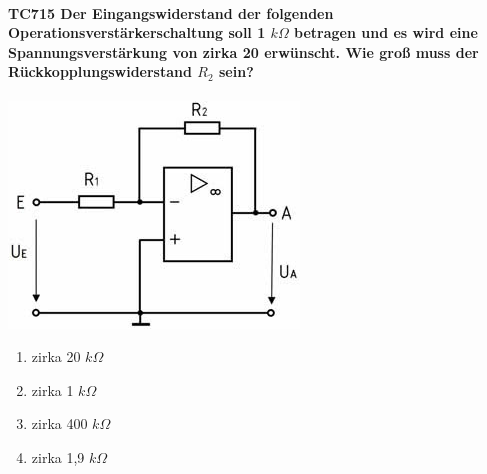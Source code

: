 \documentclass[8pt]{article}
\begin{document}
\begin{enumerate}
\begin{enumerate}[nolistsep,label=\Alph*]
{\begin{enumerate}[nolistsep,label=\Alph*]
\paragraph*{TC715 Der Eingangswiderstand der folgenden Operationsverstärkerschaltung soll 1 $k\Omega$ betragen und es wird eine Spannungsverstärkung von zirka 20 erwünscht. Wie groß muss der Rückkopplungswiderstand $R_{2}$ sein?}
\begin{center}
	\begin{minipage}{\linewidth}
		\centering
		\includegraphics[scale=1.0]{pics/tc715_a.jpg}
	\end{minipage}
\end{center}
\begin{enumerate}[nolistsep,label=\Alph*]
\item zirka 20 $k\Omega$
\item zirka 1 $k\Omega$
\item zirka 400 $k\Omega$
\item zirka 1,9 $k\Omega$
\end{enumerate}


\end{enumerate}}
\end{enumerate}
\end{enumerate}
\end{document}
